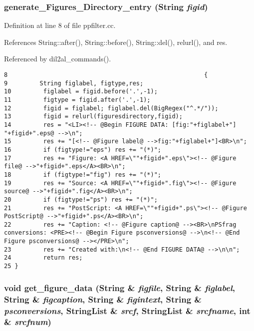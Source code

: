 \subsubsection{ generate\_\-Figures\_\-Directory\_\-entry ({\bf String} {\em figid})}\label{ppfilter_8cc_a0}




Definition at line 8 of file ppfilter.cc.

References String::after(), String::before(), String::del(), relurl(), and res.

Referenced by dil2al\_\-commands().



\footnotesize\begin{verbatim}8                                                       {
9         String figlabel, figtype,res;
10         figlabel = figid.before('.',-1);
11         figtype = figid.after('.',-1);
12         figid = figlabel; figlabel.del(BigRegex("^.*/"));
13         figid = relurl(figuresdirectory,figid);
14         res = "<LI><!-- @Begin FIGURE DATA: [fig:"+figlabel+"] "+figid+".eps@ -->\n";
15         res += "[<!-- @Figure label@ -->fig:"+figlabel+"]<BR>\n";
16         if (figtype!="eps") res += "(*)";
17         res += "Figure: <A HREF=\""+figid+".eps\"><!-- @Figure file@ -->"+figid+".eps</A><BR>\n";
18         if (figtype!="fig") res += "(*)";
19         res += "Source: <A HREF=\""+figid+".fig\"><!-- @Figure source@ -->"+figid+".fig</A><BR>\n";
20         if (figtype!="ps") res += "(*)";
21         res += "PostScript: <A HREF=\""+figid+".ps\"><!-- @Figure PostScript@ -->"+figid+".ps</A><BR>\n";
22         res += "Caption: <!-- @Figure caption@ --><BR>\nPSfrag conversions: <PRE><!-- @Begin Figure psconversions@ -->\n<!-- @End Figure psconversions@ --></PRE>\n";
23         res += "Created with:\n<!-- @End FIGURE DATA@ -->\n\n";
24         return res;
25 }
\end{verbatim}\normalsize 
{}
\subsubsection{\setlength{\rightskip}{0pt plus 5cm}void get\_\-figure\_\-data ({\bf String} \& {\em figfile}, {\bf String} \& {\em figlabel}, {\bf String} \& {\em figcaption}, {\bf String} \& {\em figintext}, {\bf String} \& {\em psconversions}, {\bf String\-List} \& {\em srcf}, {\bf String\-List} \& {\em srcfname}, int \& {\em srcfnum})}\label{ppfilter_8cc_a1}




